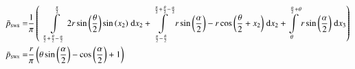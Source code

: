\begin{align}
    \bar{p}_{\text{\tiny{SW8}}} =&\frac{1}{\pi} \left(\;\;\int\limits_{\frac{\pi}{2} + \frac{\theta}{2} - \frac{\alpha}{2}}^{\frac{\pi}{2}}2 r \sin{\left (\frac{\theta}{2} \right )} \sin{\left (x_{2} \right )}\;\mathrm{d}x_{2}+\int\limits_{\frac{\pi}{2} - \frac{\theta}{2}}^{\frac{\pi}{2} + \frac{\theta}{2} - \frac{\alpha}{2}}r \sin{\left (\frac{\alpha}{2} \right )} - r \cos{\left (\frac{\theta}{2} + x_{2} \right )}\;\mathrm{d}x_{2}+\int\limits_{\theta}^{\frac{\alpha}{2} + \theta}r \sin{\left (\frac{\alpha}{2} \right )}\;\mathrm{d}x_{3}\right)\label{pSW8Def}\\
    \bar{p}_{\text{\tiny{SW8}}}  =& \frac{r}{\pi} \left(\theta \sin{\left (\frac{\alpha}{2} \right )} - \cos{\left (\frac{\alpha}{2} \right )} + 1\right)\label{pSW8Sln}
\end{align}